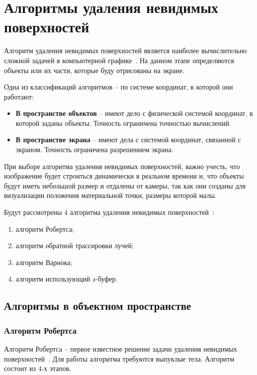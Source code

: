 \section{Алгоритмы удаления невидимых поверхностей}

Алгоритм удаления невидимых поверхностей является наиболее вычислительно сложной задачей в компьютерной графике~\cite{rodgers}. На данном этапе определяются объекты или их части, которые буду отрисованы на экране.

Одна из классификаций алгоритмов -- по системе координат, в которой они работают:
\begin{itemize}
	\item\textbf{В пространстве объектов} -- имеют дело с физической системой координат, в которой заданы объекты. Точность ограничена точностью вычислений.
	\item\textbf{В пространстве экрана} -- имеют дела с системой координат, связанной с экраном. Точность ограничена разрешением экрана.
\end{itemize}

При выборе алгоритма удаления невидимых поверхностей, важно учесть, что изображение будет строиться динамически в реальном времени и, что объекты будут иметь небольшой размер и отдалены от камеры, так как они созданы для визуализации положения материальной точки, размеры которой малы.

Будут рассмотрены 4 алгоритма удаления невидимых поверхностей~\cite{ngtu}:

\begin{enumerate}
	\item алгоритм Робертса;
	\item алгоритм обратной трассировки лучей;
	\item алгоритм Варнока;
	\item алгоритм использующий z-буфер.
\end{enumerate}

\subsection*{Алгоритмы в объектном пространстве}
\subsubsection{Алгоритм Робертса}
Алгоритм Робертса -- первое известное решение задачи удаления невидимых поверхностей~\cite{rodgers}. Для работы алгоритма требуются выпуклые тела. Алгоритм состоит из 4-х этапов.

